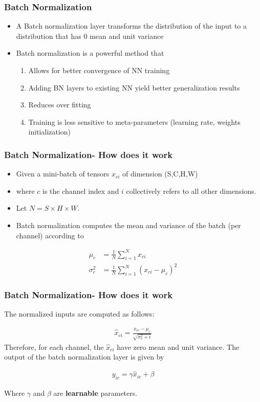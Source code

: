 \documentclass{beamer}
\begin{document}
\begin{frame}
    \frametitle{Batch Normalization}
\begin{itemize}
    \item A Batch normalization layer transforms the distribution of the input to a distribution that has 0 mean and unit variance
    \item Batch normalization is a powerful method that 
    \begin{enumerate}
        \item Allows for better convergence of NN training 
        \item Adding BN layers to existing NN yield better generalization results
        \item Reduces over fitting
        \item Training is less sensitive to meta-parameters (learning rate, weights initialization)
    \end{enumerate}
    
\end{itemize}
    

\end{frame}
\begin{frame}
    \frametitle{Batch Normalization- How does it work}
    \begin{itemize}
        \item Given a mini-batch of tensors $x_{ci}$ of dimension (S,C,H,W)
        \item  where $c$ is the channel index and $i$ collectively refers to all other dimensions. 
        \item  Let $N=S\times H\times W$.
        \item Batch normalization computes the mean and variance of the batch (per channel) according to
    \end{itemize}
        \begin{align*}
        \mu_c&=\frac{1}{N}\sum_{i=1}^N x_{ci}\\
        \sigma^2_c&=\frac{1}{N}\sum_{i=1}^N \left(x_{ci}-\mu_c\right)^2
        \end{align*}
\end{frame}

\begin{frame}
    \frametitle{Batch Normalization- How does it work}
    The normalized inputs are computed as follows:
    
    \begin{align*}
    \hat{x}_{ci}=\frac{x_{ic}-\mu_c}{\sqrt{\sigma^2_c+\epsilon}}
    \end{align*}
Therefore, for each channel, the $\hat{x}_{ci}$ have zero mean and unit variance. The output of the batch normalization layer is given by
    
    \begin{align*}
    y_{ic}=\gamma \hat{x}_{ic}+\beta
    \end{align*}
    
    Where $\gamma$ and $\beta$ are \textbf{learnable} parameters.
\end{frame}
\end{document}
